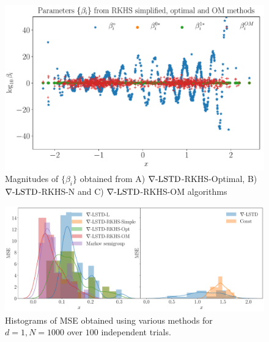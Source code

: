 \begin{figure}
	\centering
	\includegraphics[width=5in]{images/Chap4_beta_comparison}
	\caption[Parameter magnitudes comparison]{Magnitudes of $\{\beta_i\}$ obtained from A) $\nabla\text{-LSTD}$-RKHS-Optimal, B) $\nabla\text{-LSTD}$-RKHS-N and C) $\nabla\text{-LSTD}$-RKHS-OM algorithms}
	\label{fig:beta_comparison}
\end{figure}

\begin{figure}
	\centering
	\includegraphics[width=6in]{images/Chap4_hist_mse_d1_runs100}
	\caption[Histograms of MSEs obtained over $100$ trials]{Histograms of MSE obtained using various methods for $d=1,N=1000$ over $100$ independent trials.}
	\label{fig:hist_mse}
\end{figure}

